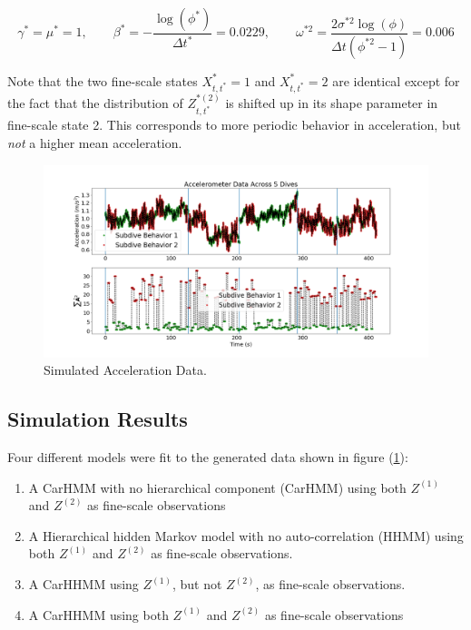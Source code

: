 $$\gamma^* = \mu^* = 1, \qquad \beta^* = -\frac{\log(\phi^*)}{\Delta t^*} = 0.0229, \qquad \omega^{*2} = \frac{2\sigma^{*2}\log(\phi)}{\Delta t (\phi^{*2}-1)} = 0.006$$

Note that the two fine-scale states $X^*_{t,t^*} = 1$ and $X^*_{t,t^*} = 2$ are identical except for the fact that the distribution of $Z^{*(2)}_{t,t^*}$ is shifted up in its shape parameter in fine-scale state 2. This corresponds to more periodic behavior in acceleration, but \textit{not} a higher mean acceleration.

\begin{figure}[!ht]
	\centering
	\includegraphics[width=5in]{../Plots/sim_data.png}
	\caption{Simulated Acceleration Data.}
	\label{fig:sim_data}
\end{figure}



\subsection{Simulation Results}

Four different models were fit to the generated data shown in figure (\ref{fig:sim_data}):

\begin{enumerate}
    \item A CarHMM with no hierarchical component (CarHMM) using both $Z^{(1)}$ and $Z^{(2)}$ as fine-scale observations
    \item A Hierarchical hidden Markov model with no auto-correlation (HHMM) using both $Z^{(1)}$ and $Z^{(2)}$ as fine-scale observations.
    \item A CarHHMM using $Z^{(1)}$, but not $Z^{(2)}$, as fine-scale observations.
    \item A CarHHMM using both $Z^{(1)}$ and $Z^{(2)}$ as fine-scale observations
\end{enumerate}

